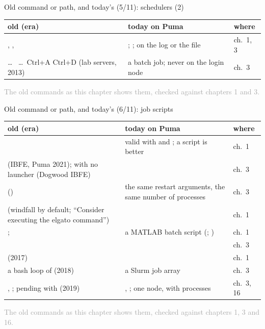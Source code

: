 \documentclass[aspectratio=169,11pt]{beamer}
\newcommand{\sourcecredit}[1]{\vfill\begin{flushright}\tiny\textcolor{DarkGray}{#1}\end{flushright}}
\begin{document}
\begin{frame}{Old command or path, and today's (5/11): schedulers (2)}
\label{fr:map3c}
\scriptsize
\renewcommand{\arraystretch}{1.1}
\setlength{\tabcolsep}{3pt}
\begin{tabular}{@{}L{0.43\textwidth}L{0.42\textwidth}L{0.1\textwidth}@{}}
\toprule
old (era) & today on Puma & where \\
\midrule
{}, ,  & ; ;  on the log or the  file & ch.\ 1, 3 \\
 \ldots\  \ldots\ Ctrl+A Ctrl+D (lab servers, 2013) & a batch job; never on the login node & ch.\ 3 \\
\bottomrule
\end{tabular}
\sourcecredit{The old commands as this chapter shows them, checked against chapters 1 and 3.}
\end{frame}

\begin{frame}{Old command or path, and today's (6/11): job scripts}
\label{fr:map3b}
\scriptsize
\renewcommand{\arraystretch}{1.1}
\setlength{\tabcolsep}{3pt}
\begin{tabular}{@{}L{0.43\textwidth}L{0.42\textwidth}L{0.1\textwidth}@{}}
\toprule
old (era) & today on Puma & where \\
\midrule
{} & valid with  and ; a script is better & ch.\ 1 \\
 (IBFE, Puma 2021);  with no launcher (Dogwood IBFE) &  & ch.\ 3 \\
 () & the same restart arguments, the same number of processes & ch.\ 3 \\
 (windfall by default; ``Consider executing the elgato command'') &  & ch.\ 1 \\
;  & a MATLAB batch script (; ) & ch.\ 1 \\
 &  & ch.\ 3 \\
 (2017) &  & ch.\ 1 \\
a bash loop of  (2018) & a Slurm job array & ch.\ 3 \\
, ; pending with  (2019) & , ; one node, with  processes & ch.\ 3, 16 \\
\bottomrule
\end{tabular}
\sourcecredit{The old commands as this chapter shows them, checked against chapters 1, 3 and 16.}
\end{frame}
\end{document}
